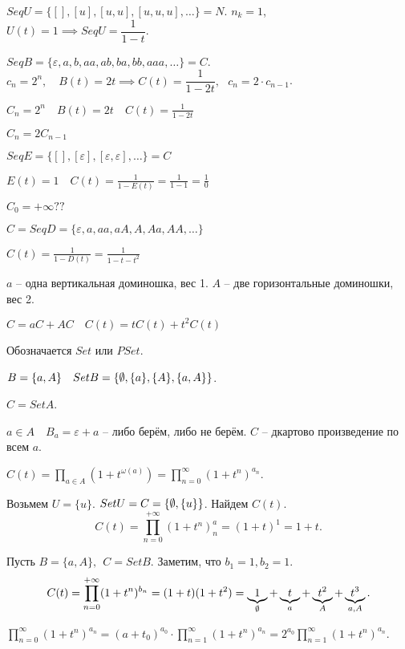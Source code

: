 \begin{example}
    $Seq U = \{[], [u], [u,u], [u, u, u], \ldots\} = N$. $n_k = 1$,~~$U(t) = 1 \implies Seq U = \dfrac{1}{1 - t}$. 

    $Seq B = \{ \varepsilon, a, b, aa, ab, ba, bb, aaa, \dots \} = C$. $c_n = 2^n,\quad B(t) = 2t \implies C(t) = \dfrac{1}{1 - 2t}, ~~~ c_n = 2 \cdot c_{n - 1}$.

    $C_n = 2^n\quad B(t) = 2t\quad C(t) = \frac{1}{1 - 2t}$
    
    $C_n = 2C_{n-1}$
    
    $Seq E = \{[], [\varepsilon], [\varepsilon, \varepsilon], \ldots\} = C$

    $E(t) = 1\quad C(t) = \frac{1}{1 - E(t)} = \frac{1}{1 -1} = \frac{1}{0}\quad$ \frownie{}

    $C_0 = +\infty ??$
\end{example}

\begin{example}
   $C = Seq D = \{\varepsilon, a, aa, aA, A, Aa, AA, \ldots\}$ 

   $C(t) = \frac{1}{1 - D(t)} = \frac{1}{1 - t - t^2}$

   $a$ -- одна вертикальная доминошка, вес 1. $A$ -- две горизонтальные доминошки, вес 2.

   $C = aC + AC\quad C(t)  = tC(t) + t^2 C(t)$
\end{example}

\begin{definition}
    [Множество]

    Обозначается $Set$ или $PSet$.

    $B = \{a, A\}\quad Set B = \{\emptyset , \{a\}, \{A\}, \{a, A\}\}$.

    $C = Set A$.

    $a\in A\quad B_a = \varepsilon + a$ -- либо берём, либо не берём. $C$ -- дкартово произведение по всем $a$.

    $C(t)  = \prod_{a\in A}\left( 1 + t^{\omega(a)} \right) = \prod_{n = 0}^{\infty } \left( 1 + t^n \right) ^{a_n}$.
\end{definition}

\begin{example}
    Возьмем $U = \{u\}$. $Set U =C =\{\emptyset , \{u\}\}$. Найдем $C(t)$.
    \[C(t) = \prod_{n=0}^{+\infty} (1 + t^n) ^a_n = (1 + t) ^ 1 = 1+ t. \] 

    Пусть $B = \{a, A \}, ~~ C = Set B$. Заметим, что $b_1 =1, b_2=1$.
    \[C(t) = \prod_{n = 0}^{+\infty} (1 + t^n)^{b_n} = (1 + t) (1  + t^2) = \underbrace{1}_{\O}  +  \underbrace{t}_{a} + \underbrace{t^2}_A + \underbrace{t^3}_{a, A}. \]

    $\prod_{n=0}^{\infty }  (1 + t^n)^{a_n} = (a + t_0)^{a_0}\cdot \prod_{n=1}^{\infty }(1 + t^n)^{a_n} = 2^{a_0}\prod_{n=1}^{\infty }(1 + t^n)^{a_n}$.
\end{example}

